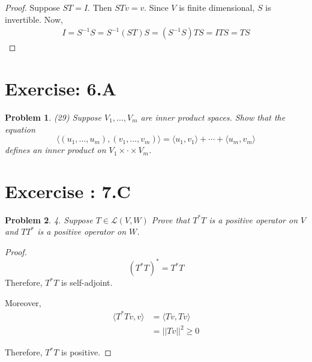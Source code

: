 \documentclass[12pt]{book}
\newtheorem*{problem*}{Problem}
\newcommand{\LL}{\mathcal{L}}
\begin{document}
\begin{proof}
  Suppose $ST = I$. Then $STv = v$. Since $V$ is finite dimensional, $S$ is invertible. Now,
  \begin{align*}
    I = S^{-1}S = S^{-1}(ST)S = (S^{-1}S)TS = ITS = TS
  \end{align*}
\end{proof}

\section{Exercise: 6.A}
\begin{problem*}
  (29) Suppose $V_1, \ldots, V_m$ are inner product spaces. Show that the equation 
  \[
  \langle(u_1, \ldots, u_m), (v_1, \ldots, v_m) \rangle = \langle u_1, v_1\rangle + \cdots + \langle u_m, v_m\rangle
  \]
  defines an inner product on $V_1 \times \cdot \times V_m$.
\end{problem*}


\section{Excercise : 7.C}

\begin{problem*}
4. Suppose $T \in \LL(V,W)$ Prove that $T^*T$ is a positive operator on $V$ and $TT^*$ is a positive operator on $W$. 
\end{problem*}

\begin{proof}
  \[
  (T^{*}T)^* = T^*T
  \]
  Therefore, $T^{*}T$ is self-adjoint.

  Moreover,
  \begin{align*}
    \langle T^{*}Tv, v \rangle & = \langle Tv, Tv \rangle\\
    & = ||Tv||^2 \ge 0
  \end{align*}

Therefore, $T^{*}T$ is positive. 
\end{proof}


\end{document}
